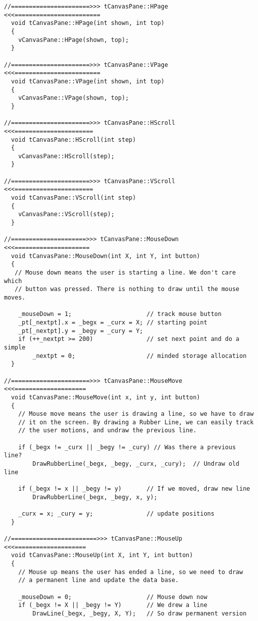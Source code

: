 \begin{verbatim}
//======================>>> tCanvasPane::HPage <<<========================
  void tCanvasPane::HPage(int shown, int top)
  {
    vCanvasPane::HPage(shown, top);
  }

//======================>>> tCanvasPane::VPage <<<========================
  void tCanvasPane::VPage(int shown, int top)
  {
    vCanvasPane::VPage(shown, top);
  }

//======================>>> tCanvasPane::HScroll <<<======================
  void tCanvasPane::HScroll(int step)
  {
    vCanvasPane::HScroll(step);
  }

//======================>>> tCanvasPane::VScroll <<<======================
  void tCanvasPane::VScroll(int step)
  {
    vCanvasPane::VScroll(step);
  }

//=====================>>> tCanvasPane::MouseDown <<<=====================
  void tCanvasPane::MouseDown(int X, int Y, int button)
  {
   // Mouse down means the user is starting a line. We don't care which
   // button was pressed. There is nothing to draw until the mouse moves.

    _mouseDown = 1;                     // track mouse button
    _pt[_nextpt].x = _begx = _curx = X; // starting point
    _pt[_nextpt].y = _begy = _cury = Y;
    if (++_nextpt >= 200)               // set next point and do a simple
        _nextpt = 0;                    // minded storage allocation
  }

//======================>>> tCanvasPane::MouseMove <<<====================
  void tCanvasPane::MouseMove(int x, int y, int button)
  {
    // Mouse move means the user is drawing a line, so we have to draw
    // it on the screen. By drawing a Rubber Line, we can easily track
    // the user motions, and undraw the previous line.

    if (_begx != _curx || _begy != _cury) // Was there a previous line?
        DrawRubberLine(_begx, _begy, _curx, _cury);  // Undraw old line

    if (_begx != x || _begy != y)       // If we moved, draw new line
        DrawRubberLine(_begx, _begy, x, y);
    
    _curx = x; _cury = y;               // update positions
  }

//========================>>> tCanvasPane::MouseUp <<<====================
  void tCanvasPane::MouseUp(int X, int Y, int button)
  {
    // Mouse up means the user has ended a line, so we need to draw
    // a permanent line and update the data base.

    _mouseDown = 0;                     // Mouse down now
    if (_begx != X || _begy != Y)       // We drew a line
        DrawLine(_begx, _begy, X, Y);   // So draw permanent version


\end{verbatim}
